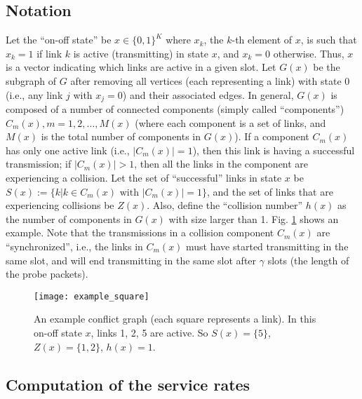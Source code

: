 \documentclass{IEEEtran}
\begin{document}
\subsection{Notation}

Let the {}``on-off state'' be $x\in\{0,1\}^{K}$ where $x_{k}$,
the $k$-th element of $x$, is such that $x_{k}=1$ if link $k$
is active (transmitting) in state $x$, and $x_{k}=0$ otherwise.
Thus, $x$ is a vector indicating which links are active in a given
slot. Let $G(x)$ be the subgraph of $G$ after removing all vertices
(each representing a link) with state 0 (i.e., any link $j$ with
$x_{j}=0$) and their associated edges. In general, $G(x)$ is composed
of a number of connected components (simply called {}``components'')
$C_{m}(x),m=1,2,\dots,M(x)$ (where each component is a set of links,
and $M(x)$ is the total number of components in $G(x)$). If a component
$C_{m}(x)$ has only one active link (i.e., $|C_{m}(x)|=1$), then
this link is having a successful transmission; if $|C_{m}(x)|>1$,
then all the links in the component are experiencing a collision.
Let the set of {}``successful'' links in state $x$ be $S(x):=\{k|k\in C_{m}(x)\text{ with }|C_{m}(x)|=1\}$,
and the set of links that are experiencing collisions be $Z(x)$.
Also, define the {}``collision number'' $h(x)$ as the number of
components in $G(x)$ with size larger than 1. Fig. \ref{fig:Example_c}
shows an example. Note that the transmissions in a collision component
$C_{m}(x)$ are {}``synchronized'', i.e., the links in $C_{m}(x)$
must have started transmitting in the same slot, and will end transmitting
in the same slot after $\gamma$ slots (the length of the probe packets).\begin{figure}
\begin{centering}
\texttt{[image: example\_square]}
\par\end{centering}

\caption{\label{fig:Example_c}An example conflict graph (each square represents
a link). In this on-off state $x$, links 1, 2, 5 are active. So $S(x)=\{5\}$,
$Z(x)=\{1,2\}$, $h(x)=1$.}



\end{figure}



\subsection{Computation of the service rates}
\end{document}

